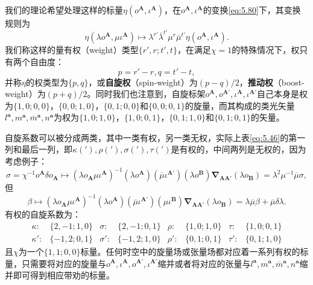 我们的理论希望处理这样的标量$\eta (o^{\boldsymbol{A}} ,\iota ^{\boldsymbol{A}} )$，在$o^{\boldsymbol{A}} ,\iota ^{\boldsymbol{A}}$的变换\ref{eq:5.80}下，其变换规则为
\begin{equation*}
	\eta (\lambda o^{\boldsymbol{A}} ,\mu \iota ^{\boldsymbol{A}} )\mapsto \lambda ^{r'}\overline{\lambda }^{t'} \mu ^{r}\overline{\mu }^{t'} \eta (o^{\boldsymbol{A}} ,\iota ^{\boldsymbol{A}} ).
\end{equation*}
我们称这样的量有权（weight）类型$\{r',r;t',t\}$，在满足$\chi =1$的特殊情况下，权只有两个自由度：
\begin{equation*}
	p=r'-r,q=t'-t,
\end{equation*}
并称$\eta $的权类型为$\{p,q\}$，或\textbf{自旋权}（spin-weight）为$( p-q) /2$，\textbf{推动权}（boost-weight）为$( p+q) /2$。同时我们也注意到，自旋标架$o^{\boldsymbol{A}} ,o^{\boldsymbol{A} '} ,\iota ^{\boldsymbol{A}} ,\iota ^{\boldsymbol{A} '}$自己本身是权为$\{1,0;0,0\}$，$\{0,0;1,0\}$，$\{0,1;0,0\}$和$\{0,0;0,1\}$的旋量，而其构成的类光矢量$l^{\boldsymbol{a}} ,m^{\boldsymbol{a}} ,\overline{m}^{\boldsymbol{a}} ,n^{\boldsymbol{a}}$为权为$\{1,0;1,0\}$，$\{1,0;0,1\}$，$\{0,1;1,0\}$和$\{0,1;0,1\}$的矢量。



自旋系数可以被分成两类，其中一类有权，另一类无权，实际上表\ref{eq:5.46}的第一列和最后一列，即$\kappa ( ') ,\rho ( ') ,\sigma ( ') ,\tau ( ')$是有权的，中间两列是无权的，因为考虑例子：
\begin{equation*}
	\sigma =\chi ^{-1} o^{\boldsymbol{A}} \delta o_{\boldsymbol{A}} \mapsto (\lambda o_{\boldsymbol{A}} \mu \iota ^{\boldsymbol{A}} )^{-1} (\lambda o^{\boldsymbol{A}} )(\overline{\mu } \iota ^{\boldsymbol{A} '} )(\lambda o^{\boldsymbol{B}} )\boldsymbol{\nabla }_{\boldsymbol{AA} '} (\lambda o_{\boldsymbol{B}} )=\lambda ^{2} \mu ^{-1}\overline{\mu } \sigma ,
\end{equation*}
但
\begin{equation*}
	\beta \mapsto (\lambda o_{\boldsymbol{A}} \mu \iota ^{\boldsymbol{A}} )^{-1} (\lambda o^{\boldsymbol{A}} )(\overline{\mu } \iota ^{\boldsymbol{A} '} )(\mu \iota ^{\boldsymbol{B}} )\boldsymbol{\nabla }_{\boldsymbol{AA} '} (\lambda o_{\boldsymbol{B}} )=\lambda \overline{\mu } \beta +\overline{\mu } \delta \lambda .
\end{equation*}
有权的自旋系数为：
\begin{equation*}
	\begin{aligned}
		\kappa : & \{2,-1;1,0\} & \sigma : & \{2,-1;0,1\} & \rho : & \{1,0;1,0\} & \tau : & \{1,0;0,1\}\\
		\kappa ': & \{-1,2;0,1\} & \sigma ': & \{-1,2;1,0\} & \rho ': & \{0,1;0,1\} & \tau ': & \{0,1;1,0\}
	\end{aligned}
\end{equation*}
且$\chi $为一个$\{1,1;0,0\}$标量。任何时空中的旋量场或张量场都对应着一系列有权的标量，只需要将对应的旋量与$o^{\boldsymbol{A}} ,\iota ^{\boldsymbol{A}} ,o^{\boldsymbol{A} '} ,\iota ^{\boldsymbol{A} '}$缩并或者将对应的张量与$l^{\boldsymbol{a}} ,m^{\boldsymbol{a}} ,\overline{m}^{\boldsymbol{a}} ,n^{\boldsymbol{a}}$缩并即可得到相应带劝的标量。


